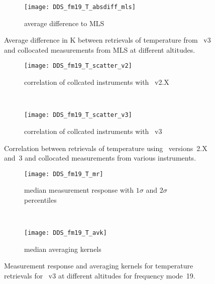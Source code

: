 \begin{figure}[htpb]
    \centering
    \begin{subfigure}[b]{0.49\textwidth}
        \texttt{[image: DDS\_fm19\_T\_absdiff\_mls]}
        \caption{average difference to MLS}
        \label{fig:fm19:T:profiles:MLS}
    \end{subfigure}
    \caption{Average difference in K between retrievals of temperature from
    \smr~v3 and collocated measurements from MLS at different altitudes.}
    \label{fig:fm19:T:profiles}
\end{figure}

\begin{figure}[htpb]
    \centering
    \begin{subfigure}[b]{0.49\textwidth}
        \texttt{[image: DDS\_fm19\_T\_scatter\_v2]}
        \caption{correlation of collcated instruments with \smr~v2.X}
        \label{fig:fm19:T:scatter:v2}
    \end{subfigure}
    \,
    \begin{subfigure}[b]{0.49\textwidth}
        \texttt{[image: DDS\_fm19\_T\_scatter\_v3]}
        \caption{correlation of collcated instruments with \smr~v3}
        \label{fig:fm19:T:scatter:v3}
    \end{subfigure}
    \caption{Correlation between retrievals of temperature using \smr\
    versions~2.X and~3 and collocated measurements from various instruments.}
    \label{fig:fm19:T:scatter}
\end{figure}

\begin{figure}[htpb]
    \centering
    \begin{subfigure}[b]{0.49\textwidth}
        \texttt{[image: DDS\_fm19\_T\_mr]}
        \caption{median measurement response with $1\sigma$ and $2\sigma$
        percentiles}
        \label{fig:fm19:T:mr}
    \end{subfigure}
    \,
    \begin{subfigure}[b]{0.49\textwidth}
        \texttt{[image: DDS\_fm19\_T\_avk]}
        \caption{median averaging kernels\newline~}
        \label{fig:fm19:T:avk}
    \end{subfigure}
    \caption{Measurement response and averaging kernels for temperature
    retrievals for \smr~v3 at different altitudes for frequency mode~19.}
    \label{fig:fm19:T:mr_avk}
\end{figure}


